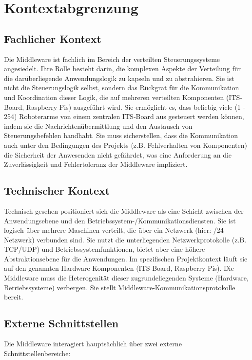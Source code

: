 \chapter{Kontextabgrenzung}


\section{Fachlicher Kontext}

Die Middleware ist fachlich im Bereich der verteilten Steuerungssysteme angesiedelt. Ihre Rolle besteht darin, die komplexen Aspekte der Verteilung für die darüberliegende Anwendungslogik zu kapseln und zu abstrahieren. Sie ist nicht die Steuerungslogik selbst, sondern das Rückgrat für die Kommunikation und Koordination dieser Logik, die auf mehreren verteilten Komponenten (ITS-Board, Raspberry Pis) ausgeführt wird. Sie ermöglicht es, dass beliebig viele (1 - 254) Roboterarme von einem zentralen ITS-Board aus gesteuert werden können, indem sie die Nachrichtenübermittlung und den Austausch von Steuerungsbefehlen handhabt. Sie muss sicherstellen, dass die Kommunikation auch unter den Bedingungen des Projekts (z.B. Fehlverhalten von Komponenten) die Sicherheit der Anwesenden nicht gefährdet, was eine Anforderung an die Zuverlässigkeit und Fehlertoleranz der Middleware impliziert.

\section{Technischer Kontext}

Technisch gesehen positioniert sich die Middleware als eine Schicht zwischen der Anwendungsebene und den Betriebssystem-/Kommunikationsdiensten. Sie ist logisch über mehrere Maschinen verteilt, die über ein Netzwerk (hier: /24 Netzwerk) verbunden sind. Sie nutzt die unterliegenden Netzwerkprotokolle (z.B. TCP/UDP) und Betriebssystemfunktionen, bietet aber eine höhere Abstraktionsebene für die Anwendungen. Im spezifischen Projektkontext läuft sie auf den genannten Hardware-Komponenten (ITS-Board, Raspberry Pis). Die Middleware muss die Heterogenität dieser zugrundeliegenden Systeme (Hardware, Betriebssysteme) verbergen. Sie stellt Middleware-Kommunikationsprotokolle bereit.

\section{Externe Schnittstellen}

Die Middleware interagiert hauptsächlich über zwei externe Schnittstellenbereiche:


